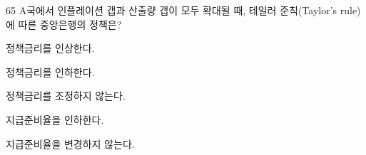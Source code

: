 \begin{question}{65}
A국에서 인플레이션 갭과 산출량 갭이 모두 확대될 때, 테일러 준칙(Taylor's rule)에 따른 중앙은행의 정책은?
\begin{choices}
  \item 정책금리를 인상한다.
  \item 정책금리를 인하한다.
  \item 정책금리를 조정하지 않는다.
  \item 지급준비율을 인하한다.
  \item 지급준비율을 변경하지 않는다.
\end{choices}
\end{question}
